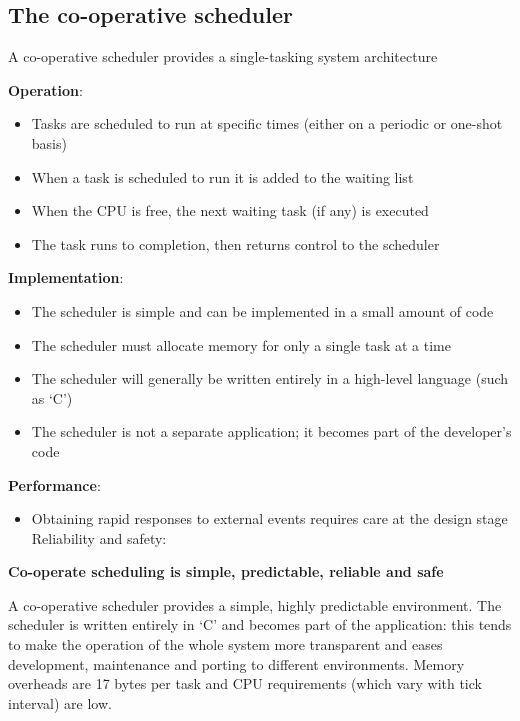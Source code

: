 \subsection{The co-operative scheduler}

A co-operative scheduler provides a single-tasking system architecture

\textbf{Operation}:
\begin{itemize}
    \item Tasks are scheduled to run at specific times (either on a periodic or one-shot basis)
    \item When a task is scheduled to run it is added to the waiting list
    \item When the CPU is free, the next waiting task (if any) is executed
    \item The task runs to completion, then returns control to the scheduler
\end{itemize}


\textbf{Implementation}:
\begin{itemize}
    \item The scheduler is simple and can be implemented in a small amount of code
    \item The scheduler must allocate memory for only a single task at a time
    \item The scheduler will generally be written entirely in a high-level language (such as ‘C’)
   \item The scheduler is not a separate application; it becomes part of the developer’s code
\end{itemize}


\textbf{Performance}:
\begin{itemize}
    \item Obtaining rapid responses to external events requires care at the design stage
Reliability and safety:

\end{itemize}

\textbf{Co-operate scheduling is simple, predictable, reliable and safe}

A co-operative scheduler provides a simple, highly predictable environment. The
scheduler is written entirely in ‘C’ and becomes part of the application: this tends to
make the operation of the whole system more transparent and eases development,
maintenance and porting to different environments. Memory overheads are 17
bytes per task and CPU requirements (which vary with tick interval) are low.

